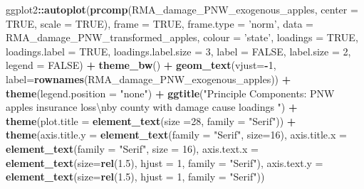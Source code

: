 \documentclass[]{article}
\newenvironment{Shaded}{\begin{snugshade}}{\end{snugshade}}
\newcommand{\CharTok}[1]{\textcolor[rgb]{0.31,0.60,0.02}{#1}}
\newcommand{\DataTypeTok}[1]{\textcolor[rgb]{0.13,0.29,0.53}{#1}}
\newcommand{\DecValTok}[1]{\textcolor[rgb]{0.00,0.00,0.81}{#1}}
\newcommand{\FloatTok}[1]{\textcolor[rgb]{0.00,0.00,0.81}{#1}}
\newcommand{\KeywordTok}[1]{\textcolor[rgb]{0.13,0.29,0.53}{\textbf{#1}}}
\newcommand{\NormalTok}[1]{#1}
\newcommand{\OperatorTok}[1]{\textcolor[rgb]{0.81,0.36,0.00}{\textbf{#1}}}
\newcommand{\OtherTok}[1]{\textcolor[rgb]{0.56,0.35,0.01}{#1}}
\newcommand{\StringTok}[1]{\textcolor[rgb]{0.31,0.60,0.02}{#1}}
\begin{document}
\begin{Shaded}
\begin{Highlighting}[]
\NormalTok{ggplot2}\OperatorTok{::}\KeywordTok{autoplot}\NormalTok{(}\KeywordTok{prcomp}\NormalTok{(RMA_damage_PNW_exogenous_apples, }\DataTypeTok{center =} \OtherTok{TRUE}\NormalTok{, }\DataTypeTok{scale =} \OtherTok{TRUE}\NormalTok{), }\DataTypeTok{frame =} \OtherTok{TRUE}\NormalTok{, }\DataTypeTok{frame.type =} \StringTok{'norm'}\NormalTok{, }\DataTypeTok{data =}\NormalTok{ RMA_damage_PNW_transformed_apples, }\DataTypeTok{colour =} \StringTok{'state'}\NormalTok{, }\DataTypeTok{loadings =} \OtherTok{TRUE}\NormalTok{, }\DataTypeTok{loadings.label =} \OtherTok{TRUE}\NormalTok{, }\DataTypeTok{loadings.label.size  =} \DecValTok{3}\NormalTok{, }\DataTypeTok{label =} \OtherTok{FALSE}\NormalTok{, }\DataTypeTok{label.size =} \DecValTok{2}\NormalTok{, }\DataTypeTok{legend =} \OtherTok{FALSE}\NormalTok{)  }\OperatorTok{+}\StringTok{ }\KeywordTok{theme_bw}\NormalTok{()   }\OperatorTok{+}\StringTok{ }\KeywordTok{geom_text}\NormalTok{(}\DataTypeTok{vjust=}\OperatorTok{-}\DecValTok{1}\NormalTok{, }\DataTypeTok{label=}\KeywordTok{rownames}\NormalTok{(RMA_damage_PNW_exogenous_apples)) }\OperatorTok{+}\StringTok{ }\KeywordTok{theme}\NormalTok{(}\DataTypeTok{legend.position =} \StringTok{"none"}\NormalTok{) }\OperatorTok{+}\StringTok{ }\KeywordTok{ggtitle}\NormalTok{(}\StringTok{"Principle Components: PNW apples insurance loss}\CharTok{\textbackslash{}n}\StringTok{by county with damage cause loadings "}\NormalTok{) }\OperatorTok{+}\StringTok{ }\KeywordTok{theme}\NormalTok{(}\DataTypeTok{plot.title =} \KeywordTok{element_text}\NormalTok{(}\DataTypeTok{size =}\DecValTok{28}\NormalTok{, }\DataTypeTok{family =} \StringTok{"Serif"}\NormalTok{)) }\OperatorTok{+}\StringTok{ }\KeywordTok{theme}\NormalTok{(}\DataTypeTok{axis.title.y =} \KeywordTok{element_text}\NormalTok{(}\DataTypeTok{family =} \StringTok{"Serif"}\NormalTok{, }\DataTypeTok{size=}\DecValTok{16}\NormalTok{), }\DataTypeTok{axis.title.x =} \KeywordTok{element_text}\NormalTok{(}\DataTypeTok{family =} \StringTok{"Serif"}\NormalTok{, }\DataTypeTok{size =} \DecValTok{16}\NormalTok{), }\DataTypeTok{axis.text.x =} \KeywordTok{element_text}\NormalTok{(}\DataTypeTok{size=}\KeywordTok{rel}\NormalTok{(}\FloatTok{1.5}\NormalTok{), }\DataTypeTok{hjust =} \DecValTok{1}\NormalTok{, }\DataTypeTok{family =} \StringTok{"Serif"}\NormalTok{), }\DataTypeTok{axis.text.y =} \KeywordTok{element_text}\NormalTok{(}\DataTypeTok{size=}\KeywordTok{rel}\NormalTok{(}\FloatTok{1.5}\NormalTok{), }\DataTypeTok{hjust =} \DecValTok{1}\NormalTok{, }\DataTypeTok{family =} \StringTok{"Serif"}\NormalTok{))}
\end{Highlighting}
\end{Shaded}
\end{document}
